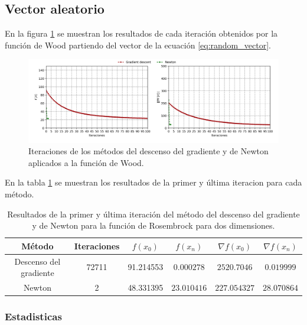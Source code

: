 \subsection{Vector aleatorio}

En la figura \ref{fig:wood_random} se muestran los resultados de cada iteración obtenidos por la función de Wood partiendo del vector de la ecuación \ref{eq:random_vector}.

\begin{figure}[H]
    \centering
    \includegraphics[width=17cm]{Graphics/Problema_2/wood_4_random.png}
    \caption{Iteraciones de los métodos del descenso del gradiente y de Newton aplicados a la función de Wood.}
    \label{fig:wood_random}
\end{figure}

En la tabla \ref{table:wood_random} se muestran los resultados de la primer y última iteracion para cada método.

\begin{table}[H]
    \centering
    \begin{tabular}{cccccc} \hline
        Método                 & Iteraciones & $f(x_0)$  & $f(x_n)$    & $\nabla f(x_0)$ & $\nabla f(x_n) $ \\ \hline
        Descenso del gradiente & 72711       & 91.214553 & $0.000278$  & $2520.7046$     & $0.019999$       \\
        Newton                 & 2           & 48.331395 & $23.010416$ & $227.054327$    & $28.070864$      \\ \hline
    \end{tabular}
    \caption{Resultados de la primer y última iteración del método del descenso del gradiente y de Newton para la función de Rosembrock para dos dimensiones.}
    \label{table:wood_random}
\end{table}

\subsubsection{Estadisticas}


